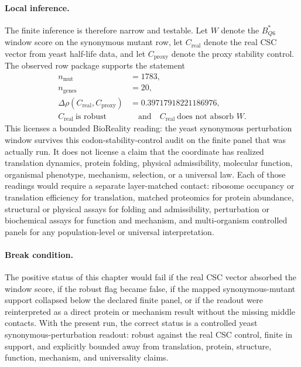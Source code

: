 \paragraph{Local inference.}
The finite inference is therefore narrow and testable.  Let $W$ denote the $B^{*}_{Q6}$ window score on the synonymous mutant row, let $C_{\mathrm{real}}$ denote the real CSC vector from yeast half-life data, and let $C_{\mathrm{proxy}}$ denote the proxy stability control.  The observed row package supports the statement
$$
\begin{aligned}
  n_{\mathrm{mut}} &= 1783,\\
  n_{\mathrm{genes}} &= 20,\\
  \Delta\rho(C_{\mathrm{real}},C_{\mathrm{proxy}}) &= 0.39717918221186976,\\
  C_{\mathrm{real}}\ \text{is robust} &\quad\text{and}\quad C_{\mathrm{real}}\ \text{does not absorb } W.
\end{aligned}
$$
This licenses a bounded BioReality reading: the yeast synonymous perturbation window survives this codon-stability-control audit on the finite panel that was actually run.  It does not license a claim that the coordinate has realized translation dynamics, protein folding, physical admissibility, molecular function, organismal phenotype, mechanism, selection, or a universal law.  Each of those readings would require a separate layer-matched contact: ribosome occupancy or translation efficiency for translation, matched proteomics for protein abundance, structural or physical assays for folding and admissibility, perturbation or biochemical assays for function and mechanism, and multi-organism controlled panels for any population-level or universal interpretation.

\paragraph{Break condition.}
The positive status of this chapter would fail if the real CSC vector absorbed the window score, if the robust flag became false, if the mapped synonymous-mutant support collapsed below the declared finite panel, or if the readout were reinterpreted as a direct protein or mechanism result without the missing middle contacts.  With the present run, the correct status is a controlled yeast synonymous-perturbation readout: robust against the real CSC control, finite in support, and explicitly bounded away from translation, protein, structure, function, mechanism, and universality claims.